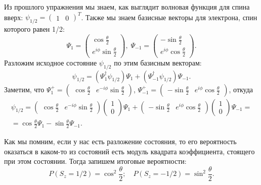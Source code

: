 Из прошлого упражнения мы знаем, как выглядит волновая функция для спина вверх:
$\psi_{1/2} =\begin{pmatrix} 1 & 0 \end{pmatrix}^T$. Также мы знаем базисные векторы для электрона, спин которого равен 1/2:
\[
  \Psi_1 = \begin{pmatrix}  \cos \frac{\theta}{2} \\ e^{i\phi} \sin\frac{\theta}{2}\end{pmatrix},\; \Psi_{-1} = \begin{pmatrix} -\sin\frac{\theta}{2} \\ e^{i\phi}\cos\frac{\theta}{2} \end{pmatrix}.
\]
Разложим исходное состояние $\psi_{1/2}$ по этим базисным векторам:
\[
  \psi_{1/2} = (\Psi_1^{\dagger}\psi_{1/2})\Psi_1 + (\Psi_{-1}^{\dagger}\psi_{1/2})\Psi_{-1}.
\]
Заметим, что $\Psi_1^{+} = \begin{pmatrix} \cos\frac{\theta}{2} & e^{-i\phi}\sin\frac{\theta}{2} \end{pmatrix}$, $\Psi_{-1}^{+} = \begin{pmatrix} -\sin\frac{\theta}{2} & e^{i\phi}\cos\frac{\theta}{2} \end{pmatrix}$, откуда
\begin{gather*}
  \psi_{1/2} = \begin{pmatrix} \cos\frac{\theta}{2} & e^{-i\phi}\sin\frac{\theta}{2} \end{pmatrix} \begin{pmatrix} 1 \\ 0 \end{pmatrix} \Psi_1 + \begin{pmatrix} -\sin\frac{\theta}{2} & e^{i\phi}\cos\frac{\theta}{2} \end{pmatrix} \begin{pmatrix} 1 \\ 0 \end{pmatrix}\Psi_{-1} = \\ = \cos\frac{\theta}{2}\Psi_1 - \sin\frac{\theta}{2}\Psi_{-1}.
\end{gather*}

Как мы помним, если у нас есть разложение состояния, то его вероятность
оказаться в каком-то из состояний есть модуль квадрата коэффициента, стоящего
при этом состоянии. Тогда запишем итоговые вероятности:
\[
  P\left(S_z = 1/2\right) = \cos^2\frac{\theta}{2};\quad P\left(S_z = -1/2\right) = \sin^2\frac{\theta}{2}.
\]
\qedsq